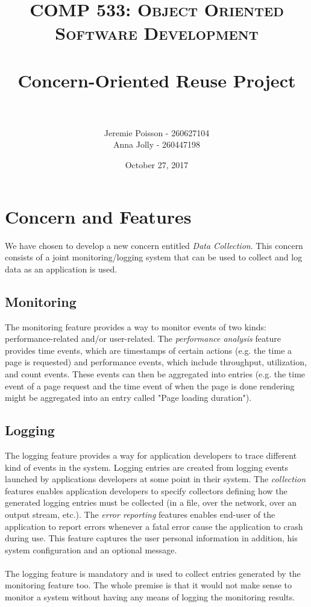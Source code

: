 \documentclass[paper=letter, fontsize=12pt]{scrartcl} %
\title{	
\normalfont \normalsize 
\textsc{COMP 533: Object Oriented Software Development} \\ [25pt] %
\horrule{0.5pt} \\[0.4cm] %
\huge Concern-Oriented Reuse Project \\ %
\horrule{2pt} \\[0.5cm] %
}
\author{Jeremie Poisson - 260627104 \\ Anna Jolly - 260447198} %
\date{\normalsize October 27, 2017} %
\numberwithin{equation}{section} %
\numberwithin{figure}{section} %
\numberwithin{table}{section} %
\begin{document}
\maketitle %

\section{Concern and Features}

We have chosen to develop a new concern entitled \textit{Data Collection}. This concern consists of a joint monitoring/logging system that can be used to collect and log data as an application is used.

\subsection{Monitoring}
\hspace*{.5cm} The monitoring feature provides a way to monitor events of two kinds: performance-related and/or user-related. The \textit{performance analysis} feature provides time events, which are timestamps of certain actions (e.g. the time a page is requested) and performance events, which include throughput, utilization, and count events. These events can then be aggregated into entries (e.g. the time event of a page request and the time event of when the page is done rendering might be aggregated into an entry called "Page loading duration"). \\

\subsection{Logging}
\hspace*{.5cm} The logging feature provides a way for application developers to trace different kind of events in the system. Logging entries are created from logging events launched by applications developers at some point in their system. The \textit{collection} features enables application developers to specify collectors defining how the generated logging entries must be collected (in a file, over the network, over an output stream, etc.). The \textit{error reporting} features enables end-user of the application to report errors whenever a fatal error cause the application to crash during use. This feature captures the user personal information in addition, his system configuration and an optional message. 
\\ \\
The logging feature is mandatory and is used to collect entries generated by the monitoring feature too. The whole premise is that it would not make sense to monitor a system without having any means of logging the monitoring results.
\end{document}
